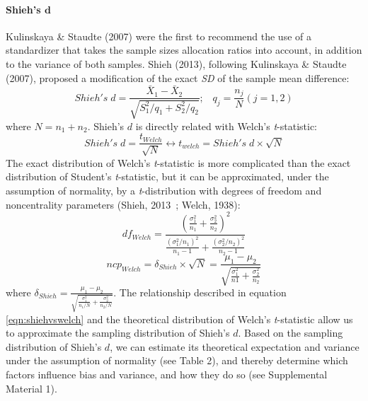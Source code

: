\documentclass[
  12pt,
  french,
]{article}
\begin{document}
\hypertarget{shiehs-bmd}{%
\paragraph{\texorpdfstring{Shieh's
\(\bm{d}\)}{Shieh's \textbackslash bm\{d\}}}\label{shiehs-bmd}}

Kulinskaya \& Staudte (2007) were the first to recommend the use of a
standardizer that takes the sample sizes allocation ratios into account,
in addition to the variance of both samples. Shieh (2013), following
Kulinskaya \& Staudte (2007), proposed a modification of the exact
\emph{SD} of the sample mean difference: \begin{equation*} 
Shieh's \; d = \frac{\bar{X}_1 - \bar{X}_2}{\sqrt{S_1^2/q_1+S_2^2/q_2}}; \;\;\; q_j=\frac{n_j}{N} (j=1,2)
\label{eqn:Shiehds}
\end{equation*} where \(N = n_1+n_2\). Shieh's \(d\) is directly related
with Welch's \emph{t}-statistic: \begin{equation} 
Shieh's \; d=\frac{t_{Welch}}{\sqrt{N}}\leftrightarrow t_{welch} = Shieh's \; d \times \sqrt{N}
\label{eqn:shiehvswelch}
\end{equation} The exact distribution of Welch's \emph{t}-statistic is
more complicated than the exact distribution of Student's
\emph{t}-statistic, but it can be approximated, under the assumption of
normality, by a \emph{t}-distribution with degrees of freedom and
noncentrality parameters (Shieh, 2013~; Welch, 1938): \begin{equation} 
df_{Welch} = \frac{\left(\frac{\sigma^2_1}{n_1}+\frac{\sigma^2_2}{n_2} \right)^2}{\frac{(\sigma^2_1/n_1)^2}{n_1-1}+\frac{(\sigma^2_2/n_2)^2}{n_2-1}}
\label{eqn:welchdf}
\end{equation} \begin{equation*} 
ncp_{Welch} = \delta_{Shieh} \times \sqrt{N} = \frac{\mu_1-\mu_2}{\sqrt{\frac{\sigma_1^2}{n1}+\frac{\sigma_2^2}{n_2}}}
\label{eqn:welchncp}
\end{equation*} where
\(\delta_{Shieh}=\frac{\mu_1-\mu_2}{\sqrt{\frac{\sigma_1^2}{n_1/N}+\frac{\sigma_2^2}{n_2/N}}}\).
The relationship described in equation \ref{eqn:shiehvswelch} and the
theoretical distribution of Welch's \emph{t}-statistic allow us to
approximate the sampling distribution of Shieh's \(d\). Based on the
sampling distribution of Shieh's \(d\), we can estimate its theoretical
expectation and variance under the assumption of normality (see Table
2), and thereby determine which factors influence bias and variance, and
how they do so (see Supplemental Material 1).
\end{document}
